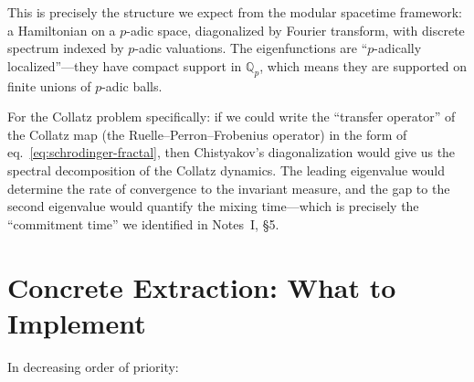 \documentclass[11pt,a4paper]{article}
\newcommand{\Q}{\mathbb{Q}}
\newcommand{\Qp}{\Q_p}
\theoremstyle{plain}
\theoremstyle{definition}
\begin{document}
\begin{keyinsight}
    This is precisely the structure we expect from the modular spacetime framework: a Hamiltonian on a $p$-adic space, diagonalized by Fourier transform, with discrete spectrum indexed by $p$-adic valuations. The eigenfunctions are ``$p$-adically localized''---they have compact support in $\Qp$, which means they are supported on finite unions of $p$-adic balls.

    For the Collatz problem specifically: if we could write the ``transfer operator'' of the Collatz map (the Ruelle--Perron--Frobenius operator) in the form of eq.~\eqref{eq:schrodinger-fractal}, then Chistyakov's diagonalization would give us the spectral decomposition of the Collatz dynamics. The leading eigenvalue would determine the rate of convergence to the invariant measure, and the gap to the second eigenvalue would quantify the mixing time---which is precisely the ``commitment time'' we identified in Notes~I, \S5.
\end{keyinsight}


\section{Concrete Extraction: What to Implement}\label{sec:implement}

In decreasing order of priority:
\end{document}

